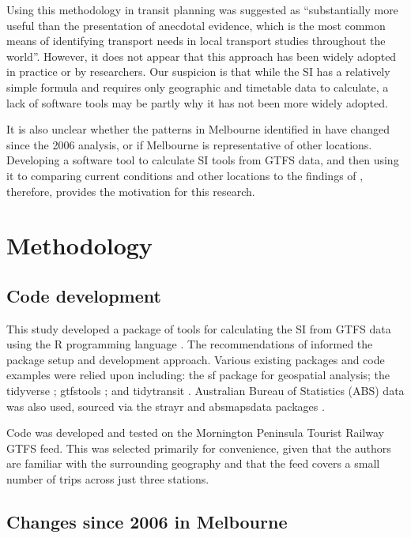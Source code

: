 \documentclass[preprint, 3p,
authoryear]{elsarticle} %
\begin{document}
Using this methodology in transit planning was suggested as
``substantially more useful than the presentation of anecdotal evidence,
which is the most common means of identifying transport needs in local
transport studies throughout the world''\citep{currie2010identifying}.
However, it does not appear that this approach has been widely adopted
in practice or by researchers. Our suspicion is that while the SI has a
relatively simple formula and requires only geographic and timetable
data to calculate, a lack of software tools may be partly why it has not
been more widely adopted.

It is also unclear whether the patterns in Melbourne identified in
\citet{currie2010identifying} have changed since the 2006 analysis, or
if Melbourne is representative of other locations. Developing a software
tool to calculate SI tools from GTFS data, and then using it to
comparing current conditions and other locations to the findings of
\citet{currie2010identifying}, therefore, provides the motivation for
this research.

\hypertarget{methodology}{%
\section{Methodology}\label{methodology}}

\hypertarget{code-development}{%
\subsection{Code development}\label{code-development}}

This study developed a package of tools for calculating the SI from GTFS
data using the R programming language \citep{R-base}. The
recommendations of \citet{wickham2023r} informed the package setup and
development approach. Various existing packages and code examples were
relied upon including: the sf package \citep{R-sf} for geospatial
analysis; the tidyverse \citep{tidyverse2019}; gtfstools
\citep{R-gtfstools}; and tidytransit \citep{R-tidytransit}. Australian
Bureau of Statistics (ABS) data was also used, sourced via the strayr
and absmapsdata packages \citep{r-strayr}.

Code was developed and tested on the Mornington Peninsula Tourist
Railway GTFS feed. This was selected primarily for convenience, given
that the authors are familiar with the surrounding geography and that
the feed covers a small number of trips across just three stations.

\hypertarget{changes-since-2006-in-melbourne}{%
\subsection{Changes since 2006 in
Melbourne}\label{changes-since-2006-in-melbourne}}
\end{document}
